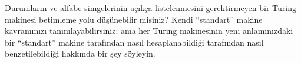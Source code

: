 \documentclass[../../../include/open-logic-section]{subfiles}
\begin{document}
\begin{prob}
  Durumların ve alfabe simgelerinin açıkça listelenmesini gerektirmeyen bir
  Turing makinesi betimleme yolu düşünebilir misiniz? Kendi ``standart''
  makine kavramınızı tanımlayabilirsiniz; ama her Turing makinesinin yeni
  anlamınızdaki bir ``standart'' makine tarafından nasıl hesaplanabildiği
  tarafından nasıl benzetilebildiği hakkında bir şey söyleyin.
\end{prob}
\end{document}
